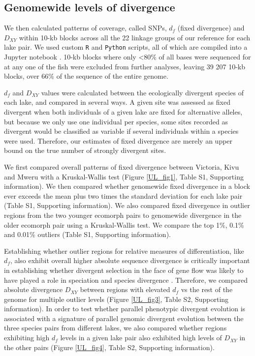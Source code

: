 \subsection{Genomewide levels of divergence}

We then calculated patterns of coverage, called SNPs, $d_f$ (fixed divergence) and $D_{XY}$ within 10-kb blocks across all the 22 linkage groups of our reference for each lake pair. We used custom {\tt R} and {\tt Python} scripts, all of which are compiled into a Jupyter notebook \cite{perez2007ipython}. 10-kb blocks where only <80\% of all bases were sequenced for at any one of the fish were excluded from further analyses, leaving 39 207 10-kb blocks, over 66\% of the sequence of the entire genome.

$d_f$ and $D_{XY}$ values were calculated between the ecologically divergent species of each lake, and compared in several ways. A given site was assessed as fixed divergent when both individuals of a given lake are fixed for alternative alleles, but because we only use one individual per species, some sites recorded as divergent would be classified as variable if several individuals within a species were used. Therefore, our estimates of fixed divergence are merely an upper bound on the true number of strongly divergent sites.

We first compared overall patterns of fixed divergence between Victoria, Kivu and Mweru with a Kruskal-Wallis test (Figure \ref{UL_fig1}, Table S1, Supporting information). We then compared whether genomewide fixed divergence in a block ever exceeds the mean plus two times the standard deviation for each lake pair (Table S1, Supporting information). We also compared fixed divergence in outlier regions from the two younger ecomorph pairs to genomewide divergence in the older ecomorph pair using a Kruskal-Wallis test. We compare the top 1\%, 0.1\% and 0.01\% outliers (Table S1, Supporting information).

Establishing whether outlier regions for relative measures of differentiation, like $d_f$, also exhibit overall higher absolute sequence divergence is critically important in establishing whether divergent selection in the face of gene flow was likely to have played a role in speciation and species divergence \cite{charlesworth1998measures, cruickshank2014reanalysis}. Therefore, we compared absolute divergence $D_{XY}$ between regions with elevated $d_f$ vs the rest of the genome for multiple outlier levels (Figure \ref{UL_fig3}, Table S2, Supporting information). In order to test whether parallel phenotypic divergent evolution is associated with a signature of parallel genomic divergent evolution between the three species pairs from different lakes, we also compared whether regions exhibiting high $d_f$ levels in a given lake pair also exhibited high levels of $D_{XY}$ in the other pairs (Figure \ref{UL_fig4}, Table S2, Supporting information).